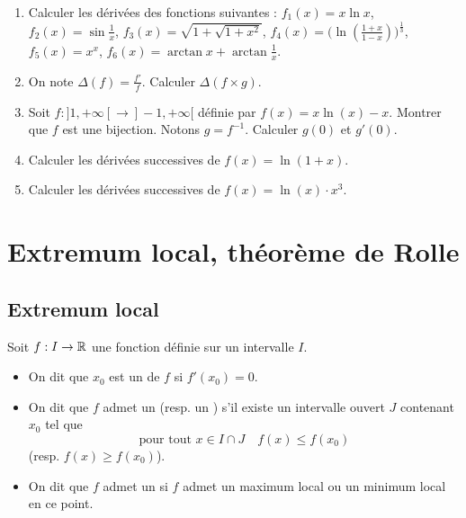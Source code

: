\documentclass[class=report,crop=false]{standalone}
\begin{document}
\begin{miniexercices}
\sauteligne
\begin{enumerate}
  \item Calculer les dérivées des fonctions suivantes :
$f_1(x) = x\ln x$, $f_2(x)=\sin \frac 1x$, $f_3(x)=\sqrt{1+\sqrt{1+x^2}}$, $f_4(x)= \big(\ln(\frac{1+x}{1-x})\big)^{\frac13}$,
$f_5(x) = x^x$, $f_6(x) = \arctan x + \arctan \frac 1x$.
  \item On note $\Delta(f)=\frac{f'}{f}$. Calculer $\Delta(f\times g)$.
  \item Soit $f : ]1, +\infty[ \to ]-1, +\infty[$ définie par $f(x)= x\ln (x) - x$.
Montrer que $f$ est une bijection. Notons $g=f^{-1}$. Calculer $g(0)$ et $g'(0)$.
  \item Calculer les dérivées successives de $f(x)=\ln(1+x)$.
  \item Calculer les dérivées successives de $f(x)=\ln(x) \cdot x^3$.
\end{enumerate}
\end{miniexercices}


\section{Extremum local, théorème de Rolle}

\subsection{Extremum local}


Soit $f : I \to \mathbb{R}$ une fonction définie sur un intervalle $I$.
\begin{definition}
\sauteligne
\begin{itemize}
  \item On dit que $x_0$ est un  de $f$ si $f'(x_0)=0$.

  \item On dit que $f$ admet un  (resp. un ) s'il existe un intervalle ouvert $J$ contenant $x_0$  tel que
$$\text{pour tout } x\in I \cap J \quad f(x) \le f(x_0)$$
(resp. $f(x) \ge f(x_0)$).
  \item On dit que $f$ admet un  si $f$ admet un maximum
local ou un minimum local en ce point.
\end{itemize}
\end{definition}
\end{document}

